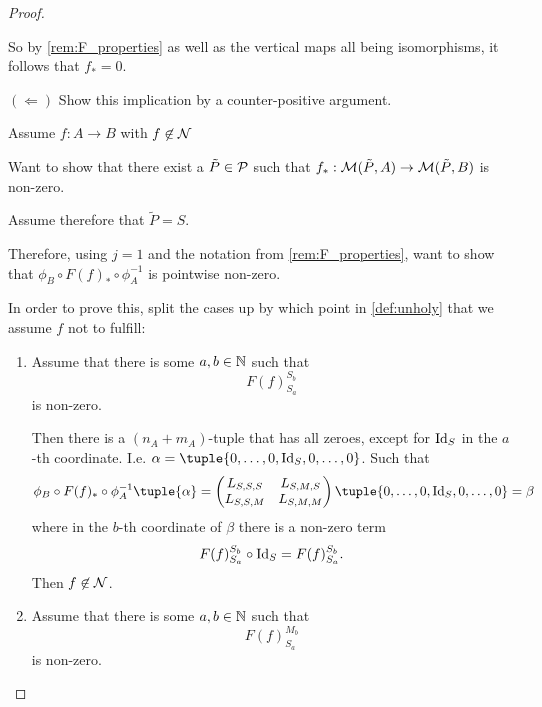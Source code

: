 \begin{proof}
\begin{enumerate}
{            So by \autoref{rem:F_properties} as well as the vertical maps all being isomorphisms, it follows that \( f_* = 0 \).

            \( ( \Leftarrow ) \) Show this implication by a counter-positive argument.

            Assume \( f: A \to B \) with \( f \not\in {\mathcal{N}} \)

            Want to show that there exist a \( \tilde{P} \in {\mathcal{P}} \) such that \( f_*: {\mathcal{M}}(\tilde{P}, A) \to {\mathcal{M}}(\tilde{P}, B)\) is non-zero.

            Assume therefore that \( \tilde{P} = S \).

            Therefore, using \( j = 1 \) and the notation from \autoref{rem:F_properties}, want to show that \( \phi_B \circ F(f)_* \circ \phi_A^{-1} \) is pointwise non-zero.

            In order to prove this, split the cases up by which point in \autoref{def:unholy} that we assume \( f \) not to fulfill:
            \begin{enumerate}
                \item {
                    Assume that there is some \( a, b \in {\mathbb{N}} \) such that
                    \[
                        F(f)_{S_a}^{S_b}
                    \]
                    is non-zero.

                    Then there is a \( (n_A + m_A) \)-tuple that has all zeroes, except for \( \operatorname{Id}_S \) in the \( a \)-th coordinate. I.e. \( \alpha = \tuple{0, \dots, 0, \Id_S, 0, \dots, 0} \). Such that
                    \[
                        \phi_B \circ F(f)_* \circ \phi_A^{-1} \tuple{\alpha}
                        =
                        \begin{pmatrix}
                            L_{S, S, S} & L_{S, M, S} \\
                            L_{S, S, M} & L_{S, M, M}
                        \end{pmatrix}
                        \tuple{0, \dots, 0, \Id_S, 0, \dots, 0}
                        = \beta
                    \]
                    where in the \( b \)-th coordinate of \( \beta \) there is a non-zero term
                    \[
                        F(f)_{S_a}^{S_b} \circ \operatorname{Id}_S = F(f)_{S_a}^{S_b}.
                    \]
                    Then \( f \not\in {\mathcal{N}} \). 
                }
                \item {
                    Assume that there is some \( a, b \in {\mathbb{N}} \) such that
                    \[
                        F(f)_{S_a}^{M_b}
                    \]
                    is non-zero.

}
\end{enumerate}}
\end{enumerate}
\end{proof}
